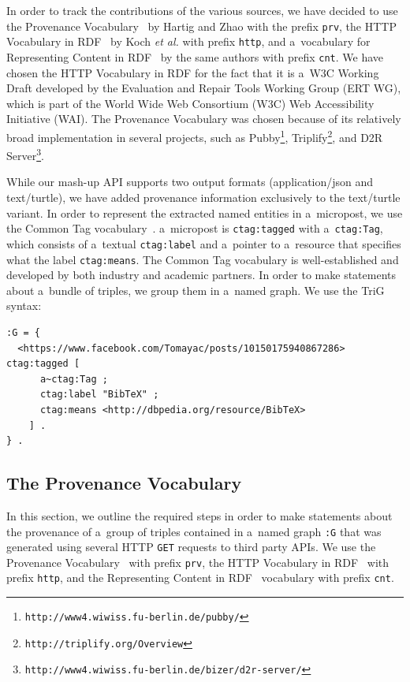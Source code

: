 In order to track the contributions of the various sources, we have decided to use the Provenance Vocabulary~\cite{Hartig:Provenance} by Hartig and Zhao with the prefix \texttt{prv}, the HTTP Vocabulary in RDF~\cite{HTTP:RDF} by Koch \emph{et al.} with prefix \texttt{http}, and a~vocabulary for Representing Content in RDF~\cite{CNT:RDF} by the same authors with prefix \texttt{cnt}. We have chosen the HTTP Vocabulary in RDF for the fact that it is a~W3C Working Draft  developed by the Evaluation and Repair Tools Working Group (ERT WG), which is part of the World Wide Web Consortium (W3C) Web Accessibility Initiative (WAI). The Provenance Vocabulary was chosen because of its relatively broad implementation in several projects, such as Pubby\footnote{\texttt{http://www4.wiwiss.fu-berlin.de/pubby/}}, Triplify\footnote{\texttt{http://triplify.org/Overview}}, and D2R Server\footnote{\texttt{http://www4.wiwiss.fu-berlin.de/bizer/d2r-server/}}.

While our mash-up API supports two output formats (application/json and text/turtle), we have added provenance information exclusively to the text/turtle variant. In order to represent the extracted named entities in a~micropost, we use the Common Tag vocabulary~\cite{CommonTag:Spec}. a~micropost is \texttt{ctag:tagged} with a~\texttt{ctag:Tag}, which consists of a~textual \texttt{ctag:label} and a~pointer to a~resource that specifies what the label \texttt{ctag:means}. The Common Tag vocabulary is well-established and developed by both industry and academic partners. In order to make statements about a~bundle of triples, we group them in a~named graph. We use the TriG~\cite{Bizer:TriG} syntax:

\begin{lstlisting}
:G = {
  <https://www.facebook.com/Tomayac/posts/10150175940867286> ctag:tagged [
      a~ctag:Tag ;
      ctag:label "BibTeX" ;
      ctag:means <http://dbpedia.org/resource/BibTeX>
    ] .
} .
\end{lstlisting}

\subsection{The Provenance Vocabulary}                                      \label{sec:provenance}
In this section, we outline the required steps in order to make statements about the provenance of a~group of triples contained in a~named graph \texttt{:G} that was generated using several HTTP \texttt{GET} requests to third party APIs. We use the Provenance Vocabulary~\cite{Hartig:Provenance} with prefix \texttt{prv}, the HTTP Vocabulary in RDF~\cite{HTTP:RDF} with prefix \texttt{http}, and the Representing Content in RDF~\cite{CNT:RDF} vocabulary with prefix \texttt{cnt}.

